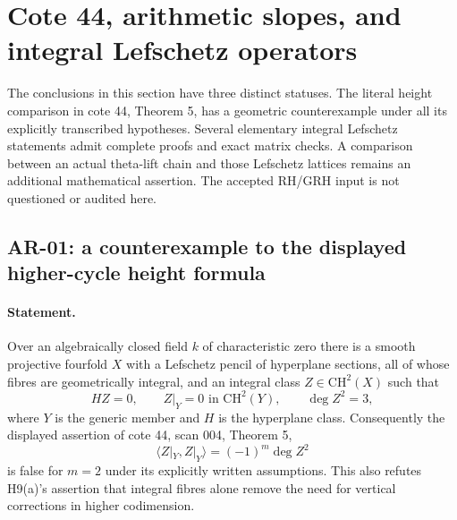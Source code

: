 \section{Cote 44, arithmetic slopes, and integral Lefschetz operators}
\label{sec:arithmetic-sl2}

The conclusions in this section have three distinct statuses.  The literal
height comparison in cote 44, Theorem 5, has a geometric counterexample under
all its explicitly transcribed hypotheses.  Several elementary integral
Lefschetz statements admit complete proofs and exact matrix checks.  A
comparison between an actual theta-lift chain and those Lefschetz lattices
remains an additional mathematical assertion.  The accepted RH/GRH input is
not questioned or audited here.

\subsection{AR-01: a counterexample to the displayed higher-cycle height formula}
\label{ar:counterexample}

\paragraph{Statement.}
Over an algebraically closed field $k$ of characteristic zero there is a
smooth projective fourfold $X$ with a Lefschetz pencil of hyperplane sections,
all of whose fibres are geometrically integral, and an integral class
$Z\in\mathrm{CH}^2(X)$ such that
\[
 HZ=0,\qquad Z|_Y=0\text{ in }\mathrm{CH}^2(Y),\qquad \deg Z^2=3,
\]
where $Y$ is the generic member and $H$ is the hyperplane class.  Consequently
the displayed assertion of cote 44, scan 004, Theorem 5,
\[
 \langle Z|_Y,Z|_Y\rangle=(-1)^m\deg Z^2
\]
is false for $m=2$ under its explicitly written assumptions.  This also
refutes H9(a)'s assertion that integral fibres alone remove the need for
vertical corrections in higher codimension.


